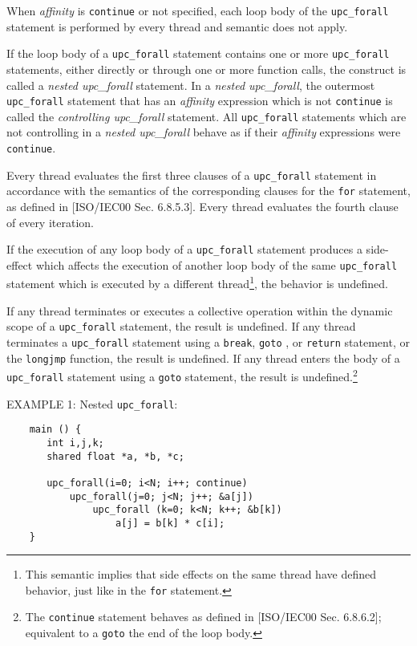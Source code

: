 \np When {\em affinity} is {\tt continue} or not specified, each loop
    body of the {\tt upc\_forall} statement is performed by every thread and
    semantic  does not apply. 

\np If the loop body of a {\tt upc\_forall} statement
    contains one or more {\tt upc\_forall} statements, either directly
    or through one or more function calls, the construct is called a
    {\em nested upc\_forall} statement.  In a {\em nested upc\_forall},
    the outermost {\tt upc\_forall} statement that has an {\em
    affinity} expression which is not {\tt continue} is called the
    {\em controlling upc\_forall} statement.  All {\tt upc\_forall}
    statements which are not controlling in a {\em nested
    upc\_forall} behave as if their {\em affinity} expressions were
    {\tt continue}.

\np Every thread evaluates the first three clauses of a 
    {\tt upc\_forall} statement in accordance with the semantics of
    the corresponding clauses for the {\tt for} statement, as defined in
    [ISO/IEC00 Sec. 6.8.5.3].  Every thread evaluates the fourth
    clause of every iteration.

\np If the execution of any loop body of a {\tt upc\_forall} statement
    produces a side-effect which affects the execution of another loop
    body of the same {\tt upc\_forall} statement which is executed by a different
    thread\footnote{This semantic implies that side effects on the same thread 
    have defined behavior, just like in the {\tt for} statement.}, the behavior is
    undefined.

\np If any thread terminates or executes a collective operation
   within the dynamic scope of a {\tt upc\_forall}
   statement, the result is undefined. If any thread terminates
   a  {\tt upc\_forall}  statement using a {\tt break},
   {\tt goto} , or {\tt return} statement, or the {\tt longjmp} function,
   the result is undefined.
   If any thread enters the body of a {\tt upc\_forall} statement
   using a {\tt goto} statement, the result is undefined.\footnote{The
   {\tt continue} statement behaves as defined in [ISO/IEC00 Sec. 
   6.8.6.2]; equivalent to a {\tt goto} the end of the loop body.}

\np EXAMPLE 1: Nested {\tt upc\_forall}: 

\begin{verbatim}
    main () { 
       int i,j,k; 
       shared float *a, *b, *c; 
    
       upc_forall(i=0; i<N; i++; continue) 
           upc_forall(j=0; j<N; j++; &a[j]) 
               upc_forall (k=0; k<N; k++; &b[k]) 
                   a[j] = b[k] * c[i]; 
    } 
\end{verbatim}

